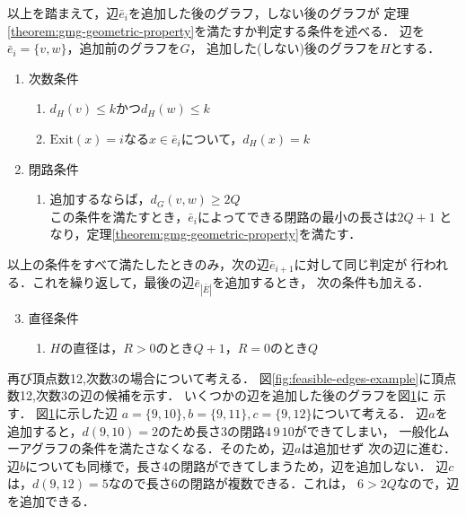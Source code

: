 以上を踏まえて，辺$\bar{e}_i$を追加した後のグラフ，しない後のグラフが
定理\ref{theorem:gmg-geometric-property}を満たすか判定する条件を述べる．
辺を$\bar{e}_i=\{v,w\}$，追加前のグラフを$G$，
追加した(しない)後のグラフを$H$とする．
\begin{enumerate}
\item 次数条件
  \label{item:degree-constraint}
  \begin{enumerate}
  \item $d_H(v)\leq k$かつ$d_H(w)\leq k$
  \item $\mathrm{Exit}(x)=i$なる$x\in\bar{e}_i$について，$d_H(x)=k$
  \end{enumerate}
\item 閉路条件
  \label{item:cycle-constraint}
  \begin{enumerate}
  \item 追加するならば，$d_G(v,w)\geq2Q$\\
    この条件を満たすとき，$\bar{e}_i$によってできる閉路の最小の長さは$2Q+1$
    となり，定理\ref{theorem:gmg-geometric-property}を満たす．
  \end{enumerate}
\end{enumerate}
以上の条件をすべて満たしたときのみ，次の辺$\bar{e}_{i+1}$に対して同じ判定が
行われる．これを繰り返して，最後の辺$\bar{e}_{|\bar{E}|}$を追加するとき，
次の条件も加える．
\begin{enumerate}\setcounter{enumi}{2}
\item 直径条件
  \label{item:diameter-constraint}
  \begin{enumerate}
  \item $H$の直径は，$R>0$のとき$Q+1$，$R=0$のとき$Q$
  \end{enumerate}
\end{enumerate}

\begin{example}
  再び頂点数12,次数3の場合について考える．
  図\ref{fig:feasible-edges-example}に頂点数12,次数3の辺の候補を示す．
  いくつかの辺を追加した後のグラフを図\ref{fig:feasible-edges-example2}に
  示す．
  図\ref{fig:feasible-edges-example2}に示した辺
  $a=\{9,10\},b=\{9,11\},c=\{9,12\}$について考える．
  辺$a$を追加すると，$d(9,10)=2$のため長さ3の閉路$4\,9\,10$ができてしまい，
  一般化ムーアグラフの条件を満たさなくなる．そのため，辺$a$は追加せず
  次の辺に進む．
  辺$b$についても同様で，長さ4の閉路ができてしまうため，辺を追加しない．
  辺$c$は，$d(9,12)=5$なので長さ6の閉路が複数できる．これは，
  $6>2Q$なので，辺を追加できる．
  \begin{figure}
    \centering
    \begin{minipage}{.4\columnwidth}
      \def\svgwidth{\textwidth}
      
      \label{fig:feasible-edges-example}
    \end{minipage}
    \hfill
    \begin{minipage}{.4\columnwidth}
      \def\svgwidth{\textwidth}
      
      \label{fig:feasible-edges-example2}
    \end{minipage}
  \end{figure}
\end{example}

